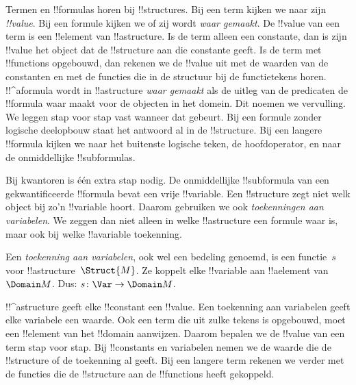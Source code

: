 \documentclass[openany]{memoir}
\begin{document}


\begin{explain}
Termen en !!{formula}s horen bij !!{structure}s. Bij een term kijken we
naar zijn \emph{!!{value}}. Bij een formule kijken we of zij wordt
\emph{waar gemaakt}. De !!{value} van een term is een !!{element} van
!!a{structure}. Is de term alleen een constante, dan is zijn !!{value}
het object dat de !!{structure} aan die constante geeft. Is de term met
!!{function}s opgebouwd, dan rekenen we de !!{value} uit met de waarden
van de constanten en met de functies die in de structuur bij de
functietekens horen. !!^a{formula} wordt in !!a{structure} \emph{waar
gemaakt} als de uitleg van de predicaten de !!{formula} waar maakt voor
de objecten in het domein. Dit noemen we vervulling. We leggen stap
voor stap vast wanneer dat gebeurt. Bij een formule zonder logische
deelopbouw staat het antwoord al in de !!{structure}. Bij een langere
!!{formula} kijken we naar het buitenste logische teken, de
hoofdoperator, en naar de onmiddellijke !!{subformula}s.

Bij kwantoren is één extra stap nodig. De onmiddellijke !!{subformula}
van een gekwantificeerde !!{formula} bevat een vrije !!{variable}.
Een !!{structure} zegt niet welk object bij zo'n !!{variable} hoort.
Daarom gebruiken we ook \emph{toekenningen aan variabelen}. We zeggen
dan niet alleen in welke !!a{structure} een formule waar is, maar ook
bij welke !!a{variable} toekenning.
\end{explain}

\begin{defn}
Een \emph{toekenning aan variabelen}, ook wel een bedeling genoemd,
is een functie~$s$ voor !!a{structure}~$\Struct{M}$. Ze koppelt elke
!!{variable} aan !!a{element} van~$\Domain M$. Dus:
$s\colon \Var \to \Domain M$.
\end{defn}

\begin{explain}
!!^a{structure} geeft elke !!{constant} een !!{value}. Een toekenning
aan variabelen geeft elke variabele een waarde. Ook een term die uit
zulke tekens is opgebouwd, moet een !!{element} van het !!{domain}
aanwijzen. Daarom bepalen we de !!{value} van een term stap voor stap.
Bij !!{constant}s en variabelen nemen we de waarde die de !!{structure}
of de toekenning al geeft. Bij een langere term rekenen we verder met
de functies die de !!{structure} aan de !!{function}s heeft gekoppeld.
\end{explain}
\end{document}
